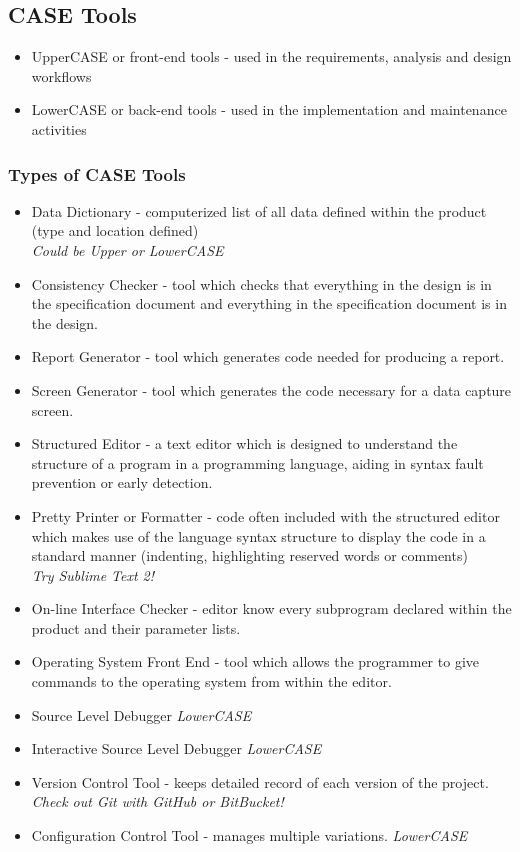\documentclass{report}
\begin{document}
			\subsection{CASE Tools}
				\begin{itemize}
					\item UpperCASE or front-end tools - used in the requirements, analysis and design workflows
					\item LowerCASE or back-end tools - used in the implementation and maintenance activities
				\end{itemize}
				\subsubsection{Types of CASE Tools}
					\begin{itemize}
						\item Data Dictionary - computerized list of all data defined within the product (type and location defined)\\
							\textit{Could be Upper or LowerCASE}
						\item Consistency Checker - tool which checks that everything in the design is in the specification document and everything in the specification document is in the design.
						\item Report Generator - tool which generates code needed for producing a report.
						\item Screen Generator - tool which generates the code necessary for a data capture screen.
						\item Structured Editor - a text editor which is designed to understand the structure of a program in a programming language, aiding in syntax fault prevention or early detection.
						\item Pretty Printer or Formatter - code often included with the structured editor which makes use of the language syntax structure to display the code in a standard manner (indenting, highlighting reserved words or comments)\\
							\textit{Try Sublime Text 2!}
						\item On-line Interface Checker - editor know every subprogram declared within the product and their parameter lists.
						\item Operating System Front End - tool which allows the programmer to give commands to the operating system from within the editor.
						\item Source Level Debugger \textit{LowerCASE}
						\item Interactive Source Level Debugger \textit{LowerCASE}
						\item Version Control Tool - keeps detailed record of each version of the project.\\
							\textit{Check out Git with GitHub or BitBucket!}
						\item Configuration Control Tool - manages multiple variations. \textit{LowerCASE}
					\end{itemize}
\end{document}
